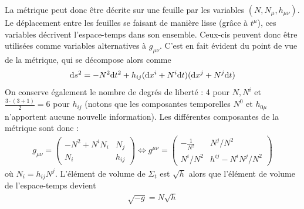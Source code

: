 La métrique peut donc être décrite sur une feuille par les variables $(N,N_\mu,h_{\mu\nu})$. Le déplacement entre les feuilles se faisant de manière lisse (grâce à $t^\mu$), ces variables décrivent l'espace-temps dans son ensemble. Ceux-cis peuvent donc être utilisées comme variables alternatives à $g_{\mu\nu}$. C'est en fait évident du point de vue de la métrique, qui se décompose alors comme
\begin{align}
    \mathrm{d} s^2 = - N^2 \mathrm{d} t^2 + h_{ij}(\mathrm{d} x^i + N^i\mathrm{d} t)(\mathrm{d} x^j + N^j\mathrm{d} t)
\end{align}
On conserve également le nombre de degrés de liberté : 4 pour $N,N^i$ et $\frac{3\cdot (3+1)}{2}=6$ pour $h_{ij}$ (notons que les composantes temporelles $N^0$ et $h_{0\mu}$ n'apportent aucune nouvelle information). Les différentes composantes de la métrique sont donc :
\begin{align}
    g_{\mu\nu} = \begin{pmatrix}
        -N^2 + N^i N_i & N_j\\
        N_i & h_{ij}
    \end{pmatrix}
    \iff
    g^{\mu\nu} = \begin{pmatrix}
        - \frac{1}{N^2} & N^j/N^2\\
        N^i/N^2 & h^{ij} - N^i N^j/N^2
    \end{pmatrix}
\end{align} 
où $N_i = h_{ij}N^j$. L'élément de volume de $\Sigma_t$ est $\sqrt{h}$ alors que l'élément de volume de l'espace-temps devient
\begin{align}
    \sqrt{-g} = N \sqrt{h}
\end{align}
